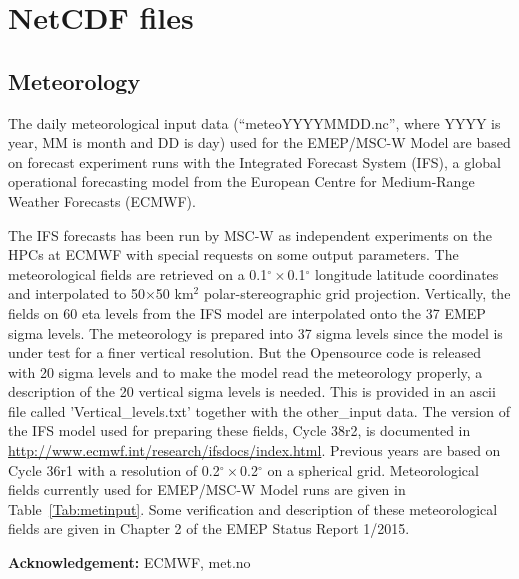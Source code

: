 \documentclass[a4paper,12pt]{report}
\begin{document}
\section{NetCDF files}



\subsection{Meteorology}
The daily meteorological input data (``meteoYYYYMMDD.nc'', where YYYY is year, MM is month 
and DD is day) used for the EMEP/MSC-W Model are based on
forecast experiment runs with the Integrated Forecast System (IFS), a global
operational forecasting model from the European Centre for Medium-Range
Weather Forecasts (ECMWF).

The IFS forecasts has been run by MSC-W as
independent experiments on the HPCs at ECMWF with special requests on
some output parameters. The meteorological fields are retrieved on a
0.1$^{\circ}\times$0.1$^{\circ}$ longitude latitude coordinates and interpolated to
50$\times$50 km$^2$ polar-stereographic grid projection. Vertically, the fields
on 60 eta levels from the IFS model are interpolated onto the 37 EMEP sigma
levels.  The meteorology is prepared into 37 sigma levels since the model is 
under test for a finer vertical resolution.  But the Opensource code is released
with 20 sigma levels and to make the model read the meteorology properly, 
a description of the 20 vertical sigma levels is needed.  This is provided in 
an ascii file called 'Vertical\_levels.txt' together with the other\_input data. 
The version of the IFS model used for preparing these fields,
Cycle 38r2, is documented in \url{http://www.ecmwf.int/research/ifsdocs/index.html}. Previous years are based on Cycle 36r1 with a resolution of 0.2$^{\circ}\times$0.2$^{\circ}$ on a spherical grid. 
Meteorological fields currently used for EMEP/MSC-W Model runs are given in
Table~\ref{Tab:metinput}. Some verification and description of these
meteorological fields are given in Chapter 2 of the EMEP Status Report
1/2015.

{\bf Acknowledgement:} ECMWF, met.no
\end{document}
